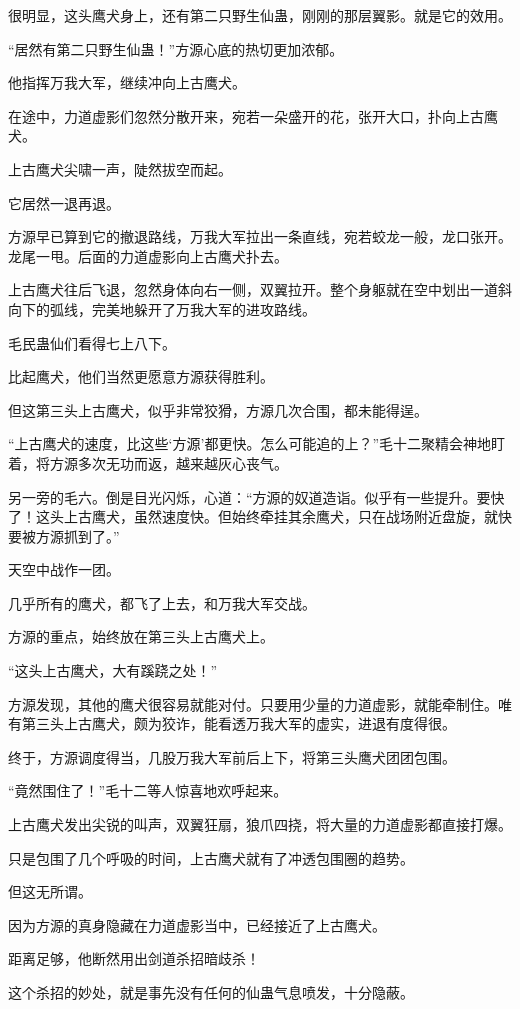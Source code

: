 \begin{this_body}
很明显，这头鹰犬身上，还有第二只野生仙蛊，刚刚的那层翼影。就是它的效用。

“居然有第二只野生仙蛊！”方源心底的热切更加浓郁。

他指挥万我大军，继续冲向上古鹰犬。

在途中，力道虚影们忽然分散开来，宛若一朵盛开的花，张开大口，扑向上古鹰犬。

上古鹰犬尖啸一声，陡然拔空而起。

它居然一退再退。

方源早已算到它的撤退路线，万我大军拉出一条直线，宛若蛟龙一般，龙口张开。龙尾一甩。后面的力道虚影向上古鹰犬扑去。

上古鹰犬往后飞退，忽然身体向右一侧，双翼拉开。整个身躯就在空中划出一道斜向下的弧线，完美地躲开了万我大军的进攻路线。

毛民蛊仙们看得七上八下。

比起鹰犬，他们当然更愿意方源获得胜利。

但这第三头上古鹰犬，似乎非常狡猾，方源几次合围，都未能得逞。

“上古鹰犬的速度，比这些‘方源’都更快。怎么可能追的上？”毛十二聚精会神地盯着，将方源多次无功而返，越来越灰心丧气。

另一旁的毛六。倒是目光闪烁，心道：“方源的奴道造诣。似乎有一些提升。要快了！这头上古鹰犬，虽然速度快。但始终牵挂其余鹰犬，只在战场附近盘旋，就快要被方源抓到了。”

天空中战作一团。

几乎所有的鹰犬，都飞了上去，和万我大军交战。

方源的重点，始终放在第三头上古鹰犬上。

“这头上古鹰犬，大有蹊跷之处！”

方源发现，其他的鹰犬很容易就能对付。只要用少量的力道虚影，就能牵制住。唯有第三头上古鹰犬，颇为狡诈，能看透万我大军的虚实，进退有度得很。

终于，方源调度得当，几股万我大军前后上下，将第三头鹰犬团团包围。

“竟然围住了！”毛十二等人惊喜地欢呼起来。

上古鹰犬发出尖锐的叫声，双翼狂扇，狼爪四挠，将大量的力道虚影都直接打爆。

只是包围了几个呼吸的时间，上古鹰犬就有了冲透包围圈的趋势。

但这无所谓。

因为方源的真身隐藏在力道虚影当中，已经接近了上古鹰犬。

距离足够，他断然用出剑道杀招暗歧杀！

这个杀招的妙处，就是事先没有任何的仙蛊气息喷发，十分隐蔽。


\end{this_body}
